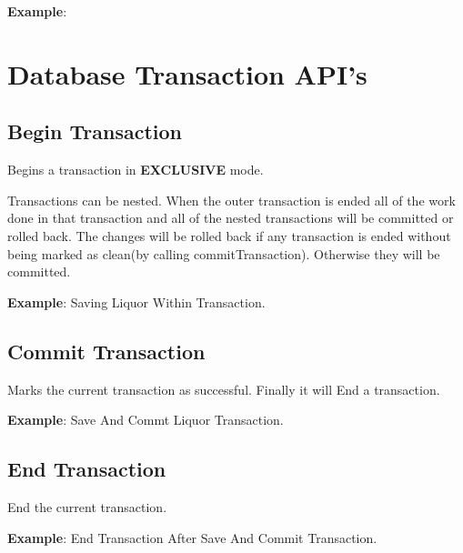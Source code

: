 			\textbf{Example}: 
				


\section{Database Transaction API's}

	\subsection{Begin Transaction}
	

	\par
	Begins a transaction in \textbf{EXCLUSIVE} mode.

	\par
	Transactions can be nested. When the outer transaction is ended all of the work done in that transaction and all of the nested transactions will be committed or rolled back. The changes will be rolled back if any transaction is ended without being marked as clean(by calling commitTransaction). Otherwise they will be committed.

				\par
				\textbf{Example}: Saving Liquor Within Transaction.
					


	\subsection{Commit Transaction}
	

	\par
	Marks the current transaction as successful. Finally it will End a transaction.

				\par
				\textbf{Example}: Save And Commt Liquor Transaction.
					

	
	\subsection{End Transaction}
	

	\par
	End the current transaction.

				\par
				\textbf{Example}: End Transaction After Save And Commit Transaction.
					


